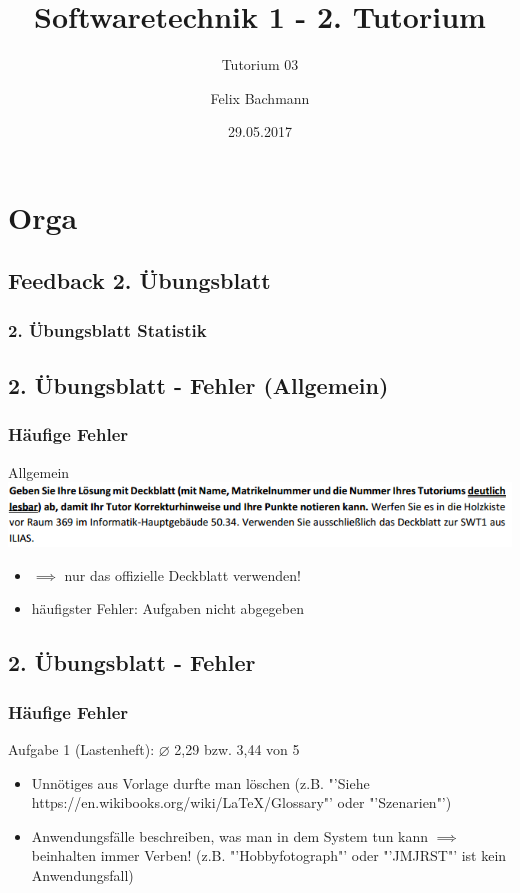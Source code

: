 \documentclass[18pt]{beamer}
\title[SWT1]{Softwaretechnik 1 - 2. Tutorium}
\subtitle{Tutorium 03}
\author{Felix Bachmann}
\date{29.05.2017}
\institute{KIT - Institut für Programmstrukturen und Datenorganisation (IPD)}
\begin{document}

\begin{frame}
\titlepage
\end{frame}

\section{Orga}
	\subsection{Feedback 2. Übungsblatt}
	\begin{frame}
		\frametitle{2. Übungsblatt Statistik}
	\end{frame}
	
	\subsection{2. Übungsblatt - Fehler (Allgemein)}
	\begin{frame}
		\frametitle{Häufige Fehler}
		\begin{block}{Allgemein}
			\includegraphics[scale=0.6]{./pics/tut2/deckblatt.png}
			\begin{itemize}
				\item $\implies$ nur das offizielle Deckblatt verwenden!
				\pause
				\item häufigster Fehler: Aufgaben nicht abgegeben
			\end{itemize}
		\end{block}
	\end{frame}
	
	\subsection{2. Übungsblatt - Fehler}
	\begin{frame}
		\frametitle{Häufige Fehler}
		\begin{block}{Aufgabe 1 (Lastenheft): $\diameter$ 2,29 bzw. 3,44 von 5}
			\begin{itemize}
				\item Unnötiges aus Vorlage durfte man löschen (z.B. "'Siehe https://en.wikibooks.org/wiki/LaTeX/Glossary"' oder "'Szenarien"')
				\pause
				\item Anwendungsfälle beschreiben, was man in dem System tun kann 
				\linebreak $\implies$ beinhalten immer Verben! (z.B. "'Hobbyfotograph"' oder "'JMJRST"' ist kein Anwendungsfall)
			\end{itemize}
		\end{block}
	\end{frame}
\end{document}
